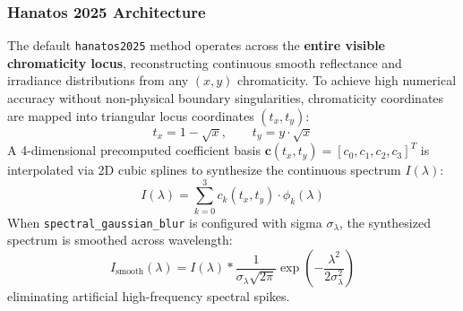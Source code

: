 \documentclass[11pt,a4paper]{article}
\begin{document}
\subsubsection{Hanatos 2025 Architecture}
The default \texttt{hanatos2025} method operates across the \textbf{entire visible chromaticity locus}, reconstructing continuous smooth reflectance and irradiance distributions from any $(x, y)$ chromaticity.
To achieve high numerical accuracy without non-physical boundary singularities, chromaticity coordinates are mapped into triangular locus coordinates $(t_x, t_y)$:
\begin{equation}
t_x = 1 - \sqrt{x}, \qquad t_y = y \cdot \sqrt{x}
\end{equation}
A 4-dimensional precomputed coefficient basis $\mathbf{c}(t_x, t_y) = [c_0, c_1, c_2, c_3]^T$ is interpolated via 2D cubic splines to synthesize the continuous spectrum $I(\lambda)$:
\begin{equation}
I(\lambda) = \sum_{k=0}^3 c_k(t_x, t_y) \cdot \phi_k(\lambda)
\end{equation}
When \texttt{spectral\_gaussian\_blur} is configured with sigma $\sigma_\lambda$, the synthesized spectrum is smoothed across wavelength:
\begin{equation}
I_{\text{smooth}}(\lambda) = I(\lambda) * \frac{1}{\sigma_\lambda \sqrt{2\pi}} \exp\left(-\frac{\lambda^2}{2\sigma_\lambda^2}\right)
\end{equation}
eliminating artificial high-frequency spectral spikes.
\end{document}
